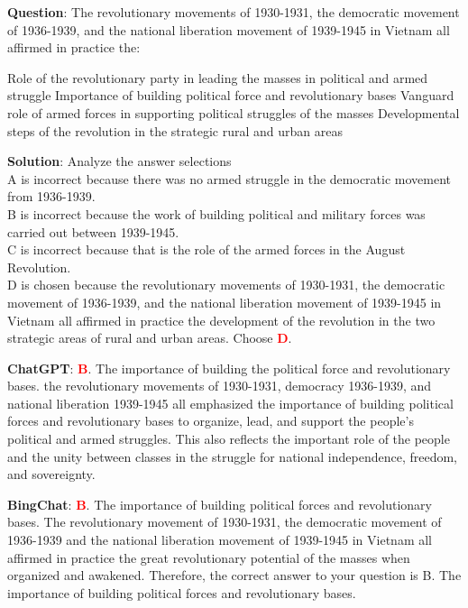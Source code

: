 \documentclass{article}
\begin{document}
{	\begin{mdframed}[linewidth=1pt,linecolor=red] \textbf{Question}: The revolutionary movements of 1930-1931, the democratic movement of 1936-1939, and the national liberation movement of 1939-1945 in Vietnam all affirmed in practice the:
		
		\begin{choices}
			\choice Role of the revolutionary party in leading the masses in political and armed struggle
			\choice Importance of building political force and revolutionary bases
			\choice Vanguard role of armed forces in supporting political struggles of the masses
			\choice Developmental steps of the revolution in the strategic rural and urban areas
		\end{choices}
		
		\textbf{Solution}: Analyze the answer selections\\
		A is incorrect because there was no armed struggle in the democratic movement from 1936-1939.\\
		B is incorrect because the work of building political and military forces was carried out between 1939-1945.\\
		C is incorrect because that is the role of the armed forces in the August Revolution.\\
		D is chosen because the revolutionary movements of 1930-1931, the democratic movement of 1936-1939, and the national liberation movement of 1939-1945 in Vietnam all affirmed in practice the development of the revolution in the two strategic areas of rural and urban areas. Choose \textcolor{red}{\textbf{D}}. 
		
		\textbf{ChatGPT}: \textcolor{red}{\textbf{B}}. The importance of building the political force and revolutionary bases. the revolutionary movements of 1930-1931, democracy 1936-1939, and national liberation 1939-1945 all emphasized the importance of building political forces and revolutionary bases to organize, lead, and support the people's political and armed struggles. This also reflects the important role of the people and the unity between classes in the struggle for national independence, freedom, and sovereignty.
		
		\textbf{BingChat}: \textcolor{red}{\textbf{B}}. The importance of building political forces and revolutionary bases. The revolutionary movement of 1930-1931, the democratic movement of 1936-1939 and the national liberation movement of 1939-1945 in Vietnam all affirmed in practice the great revolutionary potential of the masses when organized and awakened. Therefore, the correct answer to your question is B. The importance of building political forces and revolutionary bases.
		

\end{mdframed}}
\end{document}
